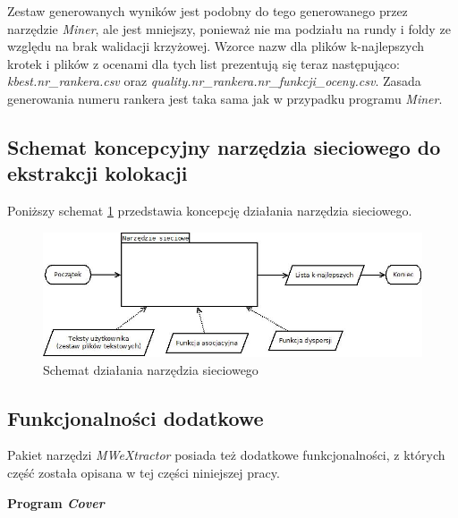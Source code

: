 \documentclass[11pt,a4paper]{llncs}
\begin{document}
Zestaw generowanych wyników jest podobny do tego generowanego przez narzędzie \emph{Miner}, ale jest mniejszy, ponieważ nie ma podziału na rundy i foldy ze względu na brak walidacji krzyżowej.
Wzorce nazw dla plików k-najlepszych krotek i plików z ocenami dla tych list prezentują się teraz następująco: \emph{kbest.nr\_rankera.csv} oraz \emph{quality.nr\_rankera.nr\_funkcji\_oceny.csv}.
Zasada generowania numeru rankera jest taka sama jak w przypadku programu \emph{Miner}.


\subsection{Schemat koncepcyjny narzędzia sieciowego do ekstrakcji kolokacji}
Poniższy schemat \ref{web_tool} przedstawia koncepcję działania narzędzia sieciowego.

\begin{figure}[h!]
\centering
\includegraphics[width=\textwidth]{charts/web_tool.jpg}
\caption [Schemat działania narzędzia sieciowego]{Schemat działania narzędzia sieciowego}
\label{web_tool}
\end{figure}


\subsection{Funkcjonalności dodatkowe}
Pakiet narzędzi \emph{MWeXtractor} posiada też dodatkowe funkcjonalności, z których część została opisana w tej części niniejszej pracy.


\noindent\textbf{Program \textit{Cover}}
\end{document}
